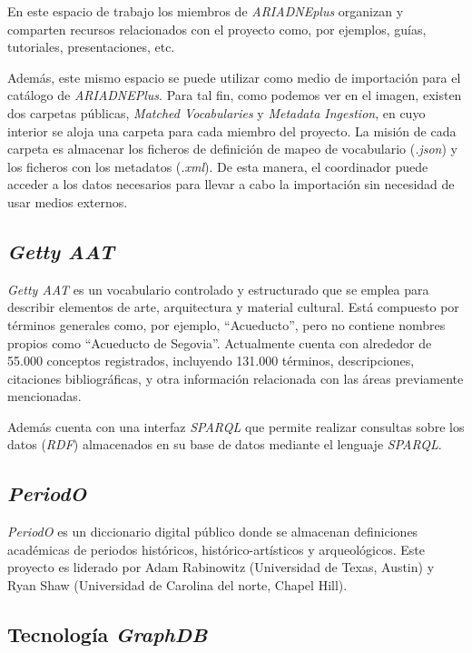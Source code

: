 En este espacio de trabajo los miembros de \emph{ARIADNEplus} organizan y
comparten recursos relacionados con el proyecto como, por ejemplos,
guías, tutoriales, presentaciones, etc.


Además, este mismo espacio se puede utilizar como medio de importación para el 
catálogo de \emph{ARIADNEPlus}.
Para tal fin, como podemos ver en el imagen, existen dos carpetas
públicas, \emph{Matched Vocabularies} y \emph{Metadata Ingestion}, en
cuyo interior se aloja una carpeta para cada miembro del proyecto. La misión de cada
carpeta es almacenar los ficheros de definición de mapeo de vocabulario (\emph{.json}) y los ficheros con los metadatos (\emph{.xml}). De esta manera, el coordinador puede acceder
a los datos necesarios para llevar a cabo la importación sin necesidad de usar medios externos.

\subsection{\emph{Getty AAT}}

\emph{Getty AAT} \cite{getty:web} es un vocabulario controlado y
estructurado que se emplea para describir elementos de arte,
arquitectura y material cultural. Está compuesto por términos generales
como, por ejemplo, ``Acueducto'', pero no contiene nombres propios como
``Acueducto de Segovia''. Actualmente cuenta con alrededor de 55.000
conceptos registrados, incluyendo 131.000 términos, descripciones,
citaciones bibliográficas, y otra información relacionada con las áreas
previamente mencionadas.

Además cuenta con una interfaz \emph{SPARQL} \cite{getty:sparql} que permite realizar consultas 
sobre los datos (\emph{RDF}) almacenados en su base de datos mediante el lenguaje \emph{SPARQL}.

\subsection{\emph{PeriodO}}

\emph{PeriodO} \cite{getty:web} es un
diccionario digital público donde se almacenan definiciones académicas
de periodos históricos, histórico-artísticos y arqueológicos. Este
proyecto es liderado por Adam Rabinowitz (Universidad de Texas, Austin)
y Ryan Shaw (Universidad de Carolina del norte, Chapel Hill).

\subsection{Tecnología \emph{GraphDB}}

